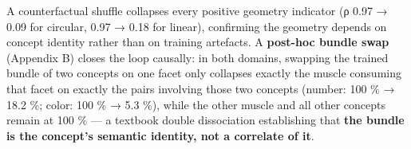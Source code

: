 A counterfactual shuffle collapses every positive geometry indicator
(\textbar ρ\textbar{} 0.97 → 0.09 for circular, 0.97 → 0.18 for linear), confirming the
geometry depends on concept identity rather than on training artefacts.
A \textbf{post-hoc bundle swap} (Appendix B) closes the loop causally: in
both domains, swapping the trained bundle of two concepts on one facet
only collapses exactly the muscle consuming that facet on exactly the
pairs involving those two concepts (number: 100 \% → 18.2 \%; color:
100 \% → 5.3 \%), while the other muscle and all other concepts remain
at 100 \% --- a textbook double dissociation establishing that \textbf{the
bundle is the concept's semantic identity, not a correlate of it}.
